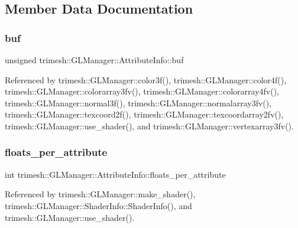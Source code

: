 \subsection{Member Data Documentation}
\mbox{\label{structtrimesh_1_1GLManager_1_1AttributeInfo_a8fbf13c65aa6d495a17d71310ace5c38}} 
\subsubsection{\texorpdfstring{buf}{buf}}
{\footnotesize\ttfamily unsigned trimesh\+::\+G\+L\+Manager\+::\+Attribute\+Info\+::buf}



Referenced by trimesh\+::\+G\+L\+Manager\+::color3f(), trimesh\+::\+G\+L\+Manager\+::color4f(), trimesh\+::\+G\+L\+Manager\+::colorarray3fv(), trimesh\+::\+G\+L\+Manager\+::colorarray4fv(), trimesh\+::\+G\+L\+Manager\+::normal3f(), trimesh\+::\+G\+L\+Manager\+::normalarray3fv(), trimesh\+::\+G\+L\+Manager\+::texcoord2f(), trimesh\+::\+G\+L\+Manager\+::texcoordarray2fv(), trimesh\+::\+G\+L\+Manager\+::use\+\_\+shader(), and trimesh\+::\+G\+L\+Manager\+::vertexarray3fv().

\mbox{\label{structtrimesh_1_1GLManager_1_1AttributeInfo_a02b42dc9c64212d889b9b3a5000ea826}} 
\subsubsection{\texorpdfstring{floats\+\_\+per\+\_\+attribute}{floats\_per\_attribute}}
{\footnotesize\ttfamily int trimesh\+::\+G\+L\+Manager\+::\+Attribute\+Info\+::floats\+\_\+per\+\_\+attribute}



Referenced by trimesh\+::\+G\+L\+Manager\+::make\+\_\+shader(), trimesh\+::\+G\+L\+Manager\+::\+Shader\+Info\+::\+Shader\+Info(), and trimesh\+::\+G\+L\+Manager\+::use\+\_\+shader().


